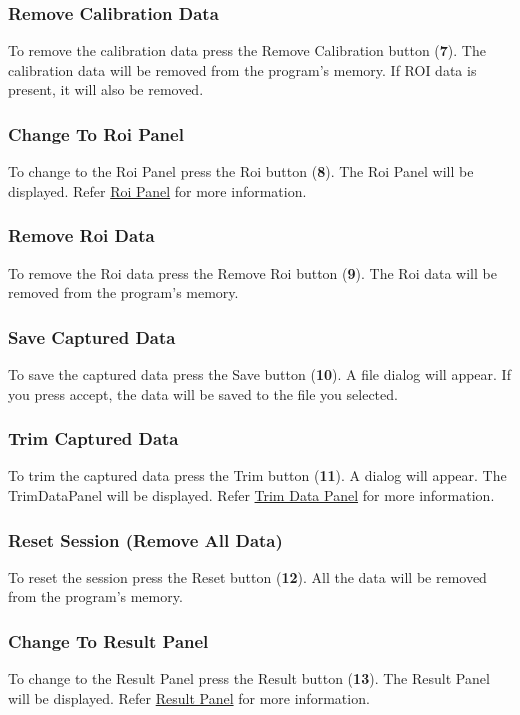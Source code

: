 \subsubsection{Remove Calibration Data}
To remove the calibration data press the Remove Calibration button (\textbf{7}). The calibration data will be removed from the program's memory. If ROI data is present, it will also be removed.

\subsubsection{Change To Roi Panel}
To change to the Roi Panel press the Roi button (\textbf{8}). The Roi Panel will be displayed. Refer \hyperref[sec:roi-panel]{Roi Panel} for more information.

\subsubsection{Remove Roi Data}
To remove the Roi data press the Remove Roi button (\textbf{9}). The Roi data will be removed from the program's memory.

\subsubsection{Save Captured  Data}
To save the captured data press the Save button (\textbf{10}). A file dialog will appear. If you press accept, the data will be saved to the file you selected.

\subsubsection{Trim Captured Data}
To trim the captured data press the Trim button (\textbf{11}). A dialog will appear. The TrimDataPanel will be displayed. Refer \hyperref[sec:trim-data-panel]{Trim Data Panel} for more information.

\subsubsection{Reset Session (Remove All Data)}
To reset the session press the Reset button (\textbf{12}). All the data will be removed from the program's memory.

\subsubsection{Change To Result Panel}
To change to the Result Panel press the Result button (\textbf{13}). The Result Panel will be displayed. Refer \hyperref[sec:result-panel]{Result Panel} for more information.

